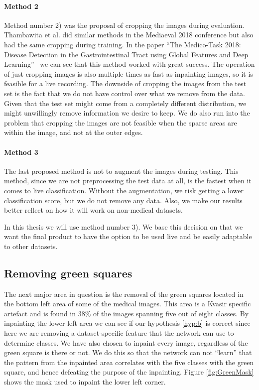 \paragraph{Method 2}
Method number 2) was the proposal of cropping the images during evaluation.  Thambawita et al. did similar methods in the Mediaeval 2018 conference but also had the same cropping during training. In the paper ``The Medico-Task 2018: Disease Detection in the Gastrointestinal Tract using Global Features and Deep Learning''~\cite{26205} we can see that this method worked with great success. 
The operation of just cropping images is also multiple times as fast as inpainting images, so it is feasible for a live recording.  
The downside of cropping the images from the test set is the fact that we do not have control over what we remove from the data. Given that the test set might come from a completely different distribution, we might unwillingly remove information we desire to keep. We do also run into the problem that cropping the images are not feasible when the sparse areas are within the image, and not at the outer edges.

\paragraph{Method 3}
The last proposed method is not to augment the images during testing. This method, since we are not preprocessing the test data at all, is the fastest when it comes to live classification. Without the augmentation, we risk getting a lower classification score, but we do not remove any data. Also, we make our results better reflect on how it will work on non-medical datasets.


In this thesis we will use method number 3). 
We base this decision on that we want the final product to have the option to be used live and be easily adaptable to other datasets.



\subsection{Removing green squares}
The next major area in question is the removal of the green squares located in the bottom left area of some of the medical images.  This area is a Kvasir specific artefact and is found in 38\% of the images spanning five out of eight classes. 
By inpainting the lower left area we can see if our hypothesis \ref{hyp:b} is correct since here we are removing a dataset-specific feature that the network can use to determine classes. 
We have also chosen to inpaint every image, regardless of the green square is there or not. We do this so that the network can not ``learn'' that the pattern from the inpainted area correlates with the five classes with the green square, and hence defeating the purpose of the inpainting. Figure \ref{fig:GreenMask} shows the mask used to inpaint the lower left corner.


